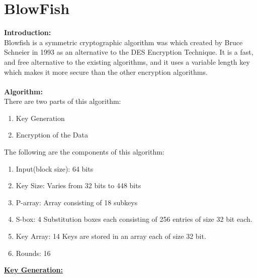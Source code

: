 \documentclass[a4paper]{report} %
\begin{document}
\section{BlowFish}
\textbf{Introduction:}\\
Blowfish is a symmetric cryptographic algorithm was which created by Bruce Schneier in 1993 as an alternative to the DES Encryption Technique. It is a fast, and free alternative to the existing algorithms, and it uses a variable length key which makes it more secure than the other encryption algorithms. \\\\
\textbf{Algorithm:}\\
There are two parts of this algorithm:\\
\begin{enumerate}
    \item Key Generation
    \item Encryption of the Data
\end{enumerate}
The following are the components of this algorithm: \\
\begin{enumerate}
    \item Input(block size): 64 bits
    \item Key Size: Varies from 32 bits to 448 bits
    \item P-array: Array consisting of 18 subkeys
    \item S-box: 4 Substitution boxes each consisting of 256 entries of size 32 bit each.
    \item Key Array: 14 Keys are stored in an array each of size 32 bit.
    \item Rounds: 16
\end{enumerate}
\textbf{\underline{Key Generation:}}\\
\end{document}
